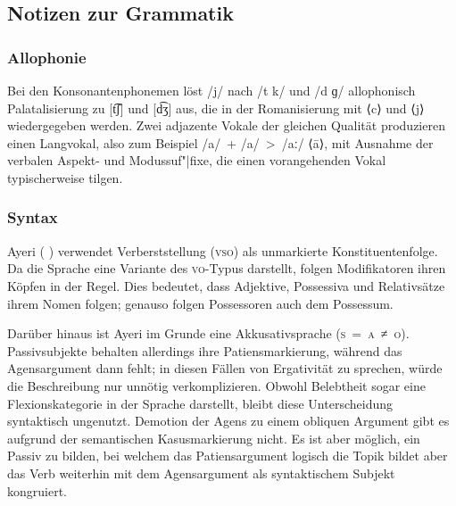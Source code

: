 \documentclass[
	12pt,
	ngerman,
]{scrartcl}
\let\q\textquote
\newcommand{\zwsp}{\mbox{​}} %
\newcommand{\ayr}[1]{\zwsp\smash{{\Tagati #1}}} %
\newcommand{\rayr}[2]{\zwsp\smash{{\Tagati #1}} \emph{#2}} %
\newcommand{\xayr}[3]{\zwsp\smash{\Tagati #1} \emph{#2} `#3'} %
\begin{document}
\subsection{Notizen zur Grammatik}
\label{subsec:gramnot}

\subsubsection{Allophonie}

Bei den Konsonantenphonemen löst /j/ nach /t k/ und /d ɡ/ allophonisch
Palatalisierung zu [t͡ʃ] und [d͡ʒ] aus, die in der Romanisierung mit ⟨c⟩ und
⟨j⟩ wiedergegeben werden.
Zwei adjazente Vokale der gleichen Qualität produzieren einen Langvokal, also
zum Beispiel /a/~+ /a/~>~/aː/ ⟨ā⟩, mit Ausnahme der verbalen Aspekt- und
Modussuf"|fixe, die einen vorangehenden Vokal typischerweise tilgen.

\subsubsection{Syntax}

Ayeri (\,\ayr{Ayeri}\,) verwendet Verberststellung (\textsc{vso}) als
unmarkierte Konstituentenfolge. Da die Sprache eine Variante des
\textsc{vo}-Typus darstellt, folgen Modifikatoren ihren Köpfen in der Regel.
Dies bedeutet, dass Adjektive, Possessiva und Relativsätze ihrem Nomen folgen;
genauso folgen Possessoren auch dem Possessum.

Darüber hinaus ist Ayeri im Grunde eine Akkusativsprache (\textsc{s~=~a~≠~o}).
\q{Echte} Passivsubjekte behalten allerdings ihre Patiensmarkierung, während
das Agensargument dann fehlt; in diesen Fällen von Ergativität zu sprechen,
würde die Beschreibung nur unnötig verkomplizieren. Obwohl Belebtheit sogar
eine Flexionskategorie in der Sprache darstellt, bleibt diese Unterscheidung
syntaktisch ungenutzt. Demotion der Agens zu einem obliquen Argument gibt es
aufgrund der semantischen Kasusmarkierung nicht. Es ist aber möglich, ein
\q{unechtes} Passiv zu bilden, bei welchem das Patiensargument logisch die
Topik bildet aber das Verb weiterhin mit dem Agensargument als syntaktischem
Subjekt kongruiert.
\end{document}
